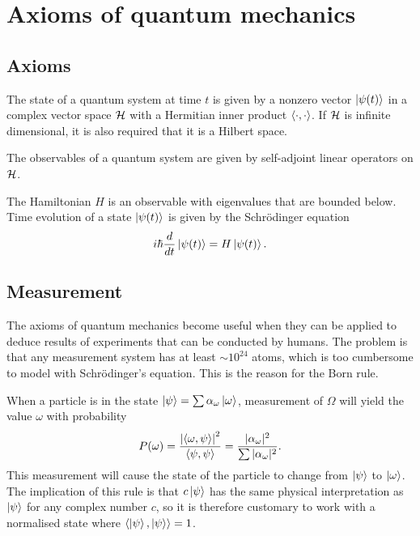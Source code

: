 \documentclass[a4paper]{article}
\begin{document}


\tableofcontents

\newpage
\section{Axioms of quantum mechanics} 
\subsection{Axioms}
\begin{axiom}[State]
    The state of a quantum system at time $t$ is given by a nonzero vector $\left\lvert \psi(t) \right\rangle$ in a complex vector space $\mathcal{H}$ with a Hermitian inner product $\left\langle \cdot , \cdot \right\rangle$. If $\mathcal{H}$ is infinite dimensional, it is also required that it is a Hilbert space.
\end{axiom}
\begin{axiom}[Observable]
    The observables of a quantum system are given by self-adjoint linear operators on $\mathcal{H}$. 
\end{axiom}
\begin{axiom}
    The Hamiltonian $H$ is an observable with eigenvalues that are bounded below. Time evolution of a state $\left\lvert \psi(t) \right\rangle$ is given by the Schr\"{o}dinger equation $$i\hbar\frac{d}{dt}\left\lvert \psi(t) \right\rangle = H\left\lvert \psi(t) \right\rangle.$$ 
\end{axiom}

\subsection{Measurement}
The axioms of quantum mechanics become useful when they can be applied to deduce results of experiments that can be conducted by humans. The problem is that any measurement system has at least $\sim 10^{24}$ atoms, which is too cumbersome to model with Schr\"{o}dinger's equation. This is the reason for the Born rule.

\begin{princ}
    When a particle is in the state $\left\lvert \psi \right\rangle = \sum \alpha_\omega \left\lvert \omega \right\rangle$, measurement of $\Omega$ will yield the value $\omega$ with probability $$P(\omega) = \frac{\left\lvert \left\langle \omega , \psi \right\rangle \right\rvert^2}{\left\langle \psi , \psi \right\rangle} = \frac{|\alpha_\omega|^2}{\sum |\alpha_\omega|^2}.$$ This measurement will cause the state of the particle to change from $\left\lvert \psi \right\rangle$ to $\left\lvert \omega \right\rangle$. The implication of this rule is that $c\left\lvert \psi \right\rangle$ has the same physical interpretation as $\left\lvert \psi \right\rangle$ for any complex number $c$, so it is therefore customary to work with a normalised state where $\left\langle \left\lvert \psi \right\rangle , \left\lvert \psi \right\rangle \right\rangle = 1$.
\end{princ}
\end{document}
